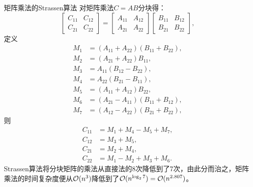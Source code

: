 \begin{theorem}
    {矩阵乘法的Strassen算法}{}
    对矩阵乘法$C=AB$分块得：
    \[
        \begin{bmatrix}
            C_{11}&C_{12}\\
            C_{21}&C_{22}
        \end{bmatrix}=\begin{bmatrix}
            A_{11}&A_{12}\\
            A_{21}&A_{22}
        \end{bmatrix}\begin{bmatrix}
            B_{11}&B_{12}\\
            B_{21}&B_{22}
        \end{bmatrix},
    \]
    定义 
    \begin{subequations}
        \begin{align}
            M_1&=(A_{11}+A_{22})(B_{11}+B_{22}),\\
            M_2&=(A_{21}+A_{22})B_{11},\\
            M_3&=A_{11}(B_{12}-B_{22}),\\
            M_4&=A_{22}(B_{21}-B_{11}),\\
            M_5&=(A_{11}+A_{12})B_{22},\\
            M_6&=(A_{21}-A_{11})(B_{11}+B_{12}),\\
            M_7&=(A_{12}-A_{22})(B_{21}+B_{22}),
        \end{align}
    \end{subequations}
    则
    \begin{subequations}
        \begin{align}
            C_{11}&=M_1+M_4-M_5+M_7,\\
            C_{12}&=M_3+M_5,\\
            C_{21}&=M_2+M_4,\\
            C_{22}&=M_1-M_2+M_3+M_6.
        \end{align}
    \end{subequations}
    Strassen算法将分块矩阵的乘法从直接法的8次降低到了7次，由此分而治之，矩阵乘法的时间复杂度便从$\mathcal O(n^3)$降低到了$\mathcal O(n^{\log_27})=\mathcal O(n^{2.807})$。
\end{theorem}

